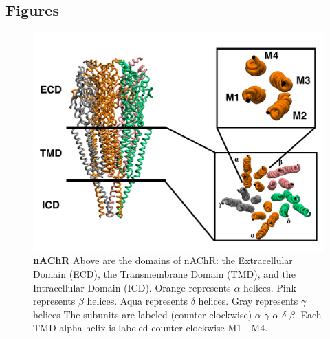 \documentclass[10pt, letterpaper]{article}
\begin{document}
\subsection{Figures}
\begin{figure}[H]
   \centerline{\includegraphics[width=\textwidth,scale=0.5]{domain_nachr.pdf}}
   \caption[nAChR]{ \textbf{nAChR} Above are the domains of nAChR: the Extracellular Domain (ECD), the Transmembrane Domain (TMD), and the Intracellular Domain (ICD). Orange represents $\alpha$ helices. Pink represents $\beta$ helices. Aqua represents $\delta$ helices. Gray represents $\gamma$ helices The subunits are labeled (counter clockwise) $\alpha$ $\gamma$ $\alpha$ $\delta$ $\beta$. Each TMD alpha helix is labeled counter clockwise M1 - M4.
}\label{fig:dom}
\end{figure}
   \newpage
\end{document}
